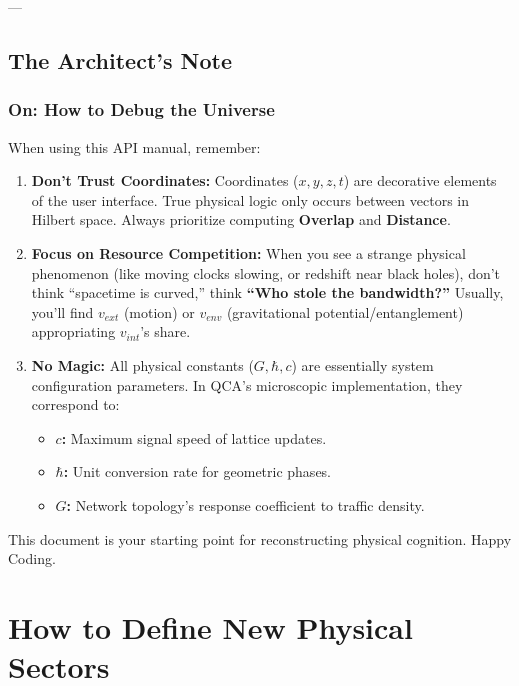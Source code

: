 \documentclass[11pt,a4paper,twoside]{book}
\begin{document}
---

\section{The Architect's Note}

\subsection{On: How to Debug the Universe}

When using this API manual, remember:

\begin{enumerate}
\item \textbf{Don't Trust Coordinates:} Coordinates ($x, y, z, t$) are decorative elements of the user interface. True physical logic only occurs between vectors in Hilbert space. Always prioritize computing \textbf{Overlap} and \textbf{Distance}.

\item \textbf{Focus on Resource Competition:} When you see a strange physical phenomenon (like moving clocks slowing, or redshift near black holes), don't think ``spacetime is curved,'' think \textbf{``Who stole the bandwidth?''} Usually, you'll find $v_{ext}$ (motion) or $v_{env}$ (gravitational potential/entanglement) appropriating $v_{int}$'s share.

\item \textbf{No Magic:} All physical constants ($G, \hbar, c$) are essentially system configuration parameters. In QCA's microscopic implementation, they correspond to:

\begin{itemize}
\item \textbf{$c$:} Maximum signal speed of lattice updates.

\item \textbf{$\hbar$:} Unit conversion rate for geometric phases.

\item \textbf{$G$:} Network topology's response coefficient to traffic density.
\end{itemize}
\end{enumerate}

This document is your starting point for reconstructing physical cognition. Happy Coding.

\clearpage{}
\clearpage{}\chapter{How to Define New Physical Sectors}
\end{document}
